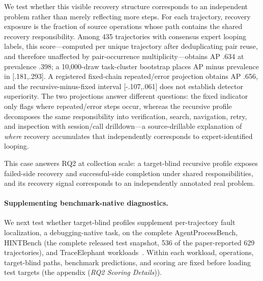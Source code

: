 \documentclass[letterpaper]{article}
\begin{document}
We test whether this visible recovery structure corresponds to an independent
problem rather than merely reflecting more steps. For each trajectory, recovery
exposure is the fraction of source operations whose path contains the shared
recovery responsibility. Among 435 trajectories with consensus expert looping
labels, this score---computed per unique trajectory after deduplicating
pair reuse, and therefore unaffected by pair-occurrence multiplicity---obtains AP .634 at prevalence .398; a 10{,}000-draw
task-cluster bootstrap places AP minus prevalence in [.181,.293]. A registered
fixed-chain repeated/error projection obtains AP .656, and the
recursive-minus-fixed interval [-.107,.061] does not establish detector
superiority. The two projections answer different questions: the fixed
indicator only flags where repeated/error steps occur, whereas the recursive
profile decomposes the same responsibility into verification, search,
navigation, retry, and inspection with session/call drilldown---a
source-drillable explanation of \emph{where} recovery accumulates that
independently corresponds to expert-identified looping.

This case answers RQ2 at collection scale: a target-blind recursive profile
exposes failed-side recovery and successful-side completion under shared
responsibilities, and its recovery signal corresponds to an independently
annotated real problem.

\paragraph{Supplementing benchmark-native diagnostics.}
We next test whether target-blind profiles supplement per-trajectory fault
localization, a debugging-native task, on the complete AgentProcessBench,
HINTBench (the complete released test snapshot, 536 of the paper-reported 629
trajectories), and TraceElephant
workloads~\cite{agentprocessbench,hintbench,traceelephant}.
Within each workload, operations, target-blind paths, benchmark predictions,
and scoring are fixed before loading test targets
(the appendix (\emph{RQ2 Scoring Details})).
\end{document}

